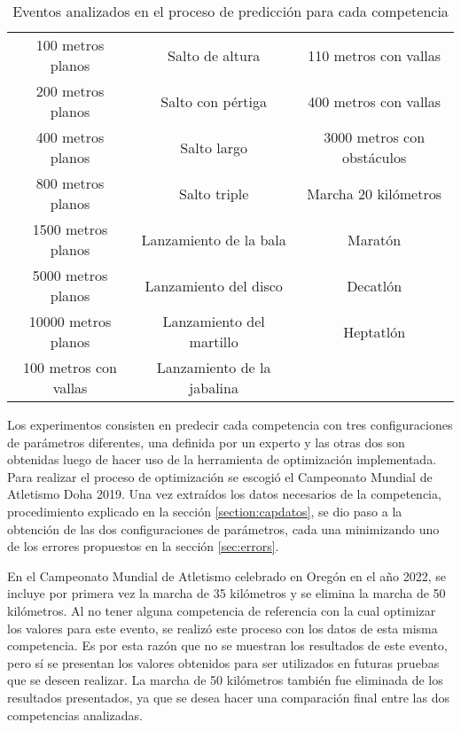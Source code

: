 \begin{table}[H]
    \centering
    \resizebox{15cm}{!} {
        \begin{tabular}{c c c}
            100 metros planos & Salto de altura & 110 metros con vallas \\
            200 metros planos & Salto con pértiga & 400 metros con vallas \\
            400 metros planos & Salto largo & 3000 metros con obstáculos \\
            800 metros planos & Salto triple & Marcha 20 kilómetros \\
            1500 metros planos & Lanzamiento de la bala & Maratón \\
            5000 metros planos & Lanzamiento del disco &  Decatlón \\
            10000 metros planos & Lanzamiento del martillo & Heptatlón \\
            100 metros con vallas & Lanzamiento de la jabalina &  \\
        \end{tabular}
        \caption{Eventos analizados en el proceso de predicción para cada competencia}
        \label{tab:events}
    }
\end{table}

Los experimentos consisten en predecir cada competencia con tres configuraciones de parámetros diferentes, una definida por un experto y las otras dos son obtenidas luego de hacer uso de la herramienta de optimización implementada. Para realizar el proceso de optimización se escogió el Campeonato Mundial de Atletismo Doha 2019. Una vez extraídos los datos necesarios de la competencia, procedimiento explicado en la sección \ref{section:capdatos}, se dio paso a la obtención de las dos configuraciones de parámetros, cada una minimizando uno de los errores propuestos en la sección \ref{sec:errors}.

En el Campeonato Mundial de Atletismo celebrado en Oregón en el año 2022, se incluye por primera vez la marcha de 35 kilómetros y se elimina la marcha de 50 kilómetros. Al no tener alguna competencia de referencia con la cual optimizar los valores para este evento, se realizó este proceso con los datos de esta misma competencia. Es por esta razón que no se muestran los resultados de este evento, pero sí se presentan los valores obtenidos para ser utilizados en futuras pruebas que se deseen realizar. La marcha de 50 kilómetros también fue eliminada de los resultados presentados, ya que se desea hacer una comparación final entre las dos competencias analizadas.

